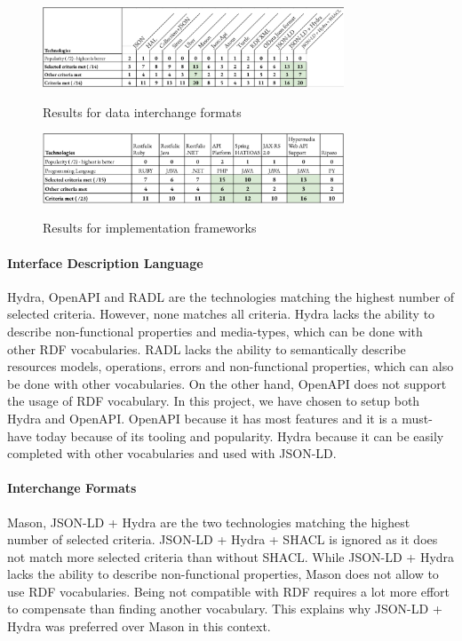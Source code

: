 \begin{figure}[ht]
\caption{Results for data interchange formats}
\centering
\includegraphics[width=0.8\textwidth]{figures/example-dif-results.png}
\label{example-dif-results}
\end{figure}

\begin{figure}[ht]
\caption{Results for implementation frameworks}
\centering
\includegraphics[width=0.8\textwidth]{figures/example-frameworks-results.png}
\label{example-frameworks-results}
\end{figure}

\paragraph{Interface Description Language}
Hydra, OpenAPI and RADL are the technologies matching the highest number of selected criteria. However, none matches all criteria. Hydra lacks the ability to describe non-functional properties and media-types, which can be done with other RDF vocabularies. RADL lacks the ability to semantically describe resources models, operations, errors and non-functional properties, which can also be done with other vocabularies. On the other hand, OpenAPI does not support the usage of RDF vocabulary. 
In this project, we have chosen to setup both Hydra and OpenAPI. OpenAPI because it has most features and it is a must-have today because of its tooling and popularity. Hydra because it can be easily completed with other vocabularies and used with JSON-LD.

\paragraph{Interchange Formats}
Mason, JSON-LD + Hydra are the two technologies matching the highest number of selected criteria. JSON-LD + Hydra + SHACL is ignored as it does not match more selected criteria than without SHACL. While JSON-LD + Hydra lacks the ability to describe non-functional properties, Mason does not allow to use RDF vocabularies. Being not compatible with RDF requires a lot more effort to compensate than finding another vocabulary. This explains why JSON-LD + Hydra was preferred over Mason in this context.

